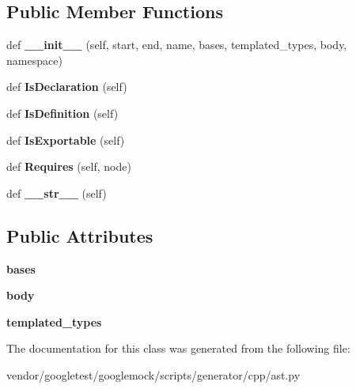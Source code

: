 \subsection*{Public Member Functions}
\begin{DoxyCompactItemize}
\item 
\mbox{\label{classcpp_1_1ast_1_1_class_acc17c34512d5cc54d5125734ce79f219}} 
def {\bfseries \+\_\+\+\_\+init\+\_\+\+\_\+} (self, start, end, name, bases, templated\+\_\+types, body, namespace)
\item 
\mbox{\label{classcpp_1_1ast_1_1_class_a4758bfb7c00410575932974e1ed8b7da}} 
def {\bfseries Is\+Declaration} (self)
\item 
\mbox{\label{classcpp_1_1ast_1_1_class_ae6d2356f835d06d5109d9e4609d86780}} 
def {\bfseries Is\+Definition} (self)
\item 
\mbox{\label{classcpp_1_1ast_1_1_class_a1ab749f8cfddb0903c6484791f70f42e}} 
def {\bfseries Is\+Exportable} (self)
\item 
\mbox{\label{classcpp_1_1ast_1_1_class_a347673e0a2a7b840b7d2d1cae13977f7}} 
def {\bfseries Requires} (self, node)
\item 
\mbox{\label{classcpp_1_1ast_1_1_class_a0a63f6fab75d61ffac6fb9f1c29ae84d}} 
def {\bfseries \+\_\+\+\_\+str\+\_\+\+\_\+} (self)
\end{DoxyCompactItemize}
\subsection*{Public Attributes}
\begin{DoxyCompactItemize}
\item 
\mbox{\label{classcpp_1_1ast_1_1_class_a5665eb67314a075d4e0ff91accbde5d1}} 
{\bfseries bases}
\item 
\mbox{\label{classcpp_1_1ast_1_1_class_add39f61fdcf6dae42d79cac3dcbb7782}} 
{\bfseries body}
\item 
\mbox{\label{classcpp_1_1ast_1_1_class_a48ed0d3115656554d9134bc1787390fa}} 
{\bfseries templated\+\_\+types}
\end{DoxyCompactItemize}


The documentation for this class was generated from the following file\+:\begin{DoxyCompactItemize}
\item 
vendor/googletest/googlemock/scripts/generator/cpp/ast.\+py\end{DoxyCompactItemize}

